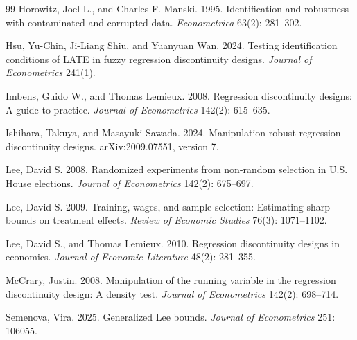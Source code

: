 \documentclass[11pt]{article}
\theoremstyle{definition}
\theoremstyle{plain}
\theoremstyle{remark}
\begin{document}
\begin{thebibliography}{99}
Horowitz, Joel L., and Charles F. Manski.
1995.
Identification and robustness with contaminated and corrupted data.
\emph{Econometrica} 63(2): 281--302.

Hsu, Yu-Chin, Ji-Liang Shiu, and Yuanyuan Wan.
2024.
Testing identification conditions of LATE in fuzzy regression discontinuity designs.
\emph{Journal of Econometrics} 241(1).

Imbens, Guido W., and Thomas Lemieux.
2008.
Regression discontinuity designs: A guide to practice.
\emph{Journal of Econometrics} 142(2): 615--635.

Ishihara, Takuya, and Masayuki Sawada.
2024.
Manipulation-robust regression discontinuity designs.
arXiv:2009.07551, version 7.

Lee, David S.
2008.
Randomized experiments from non-random selection in U.S. House elections.
\emph{Journal of Econometrics} 142(2): 675--697.

Lee, David S.
2009.
Training, wages, and sample selection: Estimating sharp bounds on treatment effects.
\emph{Review of Economic Studies} 76(3): 1071--1102.

Lee, David S., and Thomas Lemieux.
2010.
Regression discontinuity designs in economics.
\emph{Journal of Economic Literature} 48(2): 281--355.

McCrary, Justin.
2008.
Manipulation of the running variable in the regression discontinuity design: A density test.
\emph{Journal of Econometrics} 142(2): 698--714.

Semenova, Vira.
2025.
Generalized Lee bounds.
\emph{Journal of Econometrics} 251: 106055.
\end{thebibliography}
\end{document}
